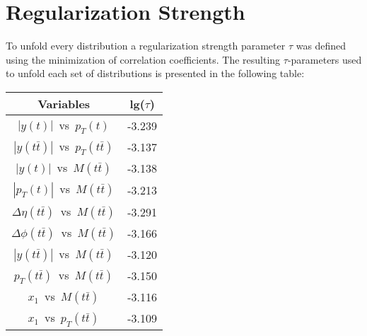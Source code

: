 \chapter{Regularization Strength}\label{appendix:tau}

To unfold every distribution a regularization strength parameter $\tau$ was defined
using the minimization of correlation coefficients\cite{VBlobelT}. The resulting $\tau$-parameters
used to unfold each set of distributions is presented in the following table:

\begin{center}
\begin{tabular}{|c|c|}
\hline
\textbf{Variables} & \textbf{lg($\tau$)} \\
\hline
\hline
$|y(t)|$~vs~$p_{T}(t)$ & -3.239 \\ \hline 
$|y(t\bar{t})|$~vs~$p_{T}(t\bar{t})$ & -3.137 \\ \hline 
$|y(t)|$~vs~$M(t\bar{t})$ & -3.138 \\ \hline 
$|p_{T}(t)|$~vs~$M(t\bar{t})$ & -3.213 \\ \hline 
$\Delta\eta(t\bar{t})$~vs~$M(t\bar{t})$ & -3.291 \\ \hline 
$\Delta\phi(t\bar{t})$~vs~$M(t\bar{t})$ & -3.166 \\ \hline 
$|y(t\bar{t})|$~vs~$M(t\bar{t})$ & -3.120 \\ \hline 
$p_{T}(t\bar{t})$~vs~$M(t\bar{t})$ & -3.150 \\ \hline 
$x_{1}$~vs~$M(t\bar{t})$ & -3.116 \\ \hline 
$x_{1}$~vs~$p_{T}(t\bar{t})$ & -3.109 \\ \hline 
\end{tabular}
\end{center}